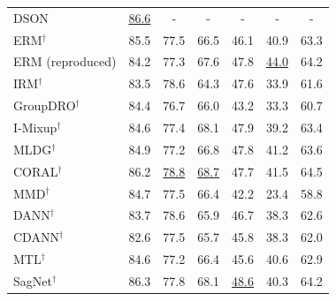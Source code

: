 \begin{table}[t]
\begin{tabular}{lccccc|c}
DSON~\cite{seo2020dson}     & \underline{86.6}          & -             & -                   & -                 & -                  & -              \\
ERM$^\dagger$~\cite{vapnik1998statistical}      & 85.5          & 77.5          & 66.5                & 46.1              & 40.9               & 63.3           \\
ERM (reproduced)     & 84.2          & 77.3          & 67.6                & 47.8              & \underline{44.0}               & 64.2           \\
IRM$^\dagger$~\cite{arjovsky2019irm}      & 83.5          & 78.6          & 64.3                & 47.6              & 33.9               & 61.6           \\
GroupDRO$^\dagger$~\cite{Sagawa2020GroupDRO} & 84.4          & 76.7          & 66.0                & 43.2              & 33.3               & 60.7           \\
I-Mixup$^\dagger$~\cite{xu2020interdomain_mixup_aaai,yan2020interdomain_mixup,wang2020interdomain_mixup_icassp_dg}    & 84.6          & 77.4          & 68.1                & 47.9              & 39.2               & 63.4           \\
MLDG$^\dagger$~\cite{li2018mldg}     & 84.9          & 77.2          & 66.8                & 47.8              & 41.2               & 63.6           \\
CORAL$^\dagger$~\cite{sun2016coral}    & 86.2          & \underline{78.8}          & \underline{68.7}                & 47.7              & 41.5               & 64.5           \\
MMD$^\dagger$~\cite{li2018mmd}      & 84.7          & 77.5          & 66.4                & 42.2              & 23.4               & 58.8           \\
DANN$^\dagger$~\cite{ganin2016dann}     & 83.7          & 78.6          & 65.9                & 46.7              & 38.3               & 62.6           \\
CDANN$^\dagger$~\cite{li2018cdann}    & 82.6          & 77.5          & 65.7                & 45.8              & 38.3               & 62.0           \\
MTL$^\dagger$~\cite{blanchard2021mtl_marginal_transfer_learning}      & 84.6          & 77.2          & 66.4                & 45.6              & 40.6               & 62.9           \\
SagNet$^\dagger$~\cite{nam2019sagnet}   & 86.3          & 77.8          & 68.1                & \underline{48.6}              & 40.3               & 64.2           \\

\end{tabular}
\end{table}

